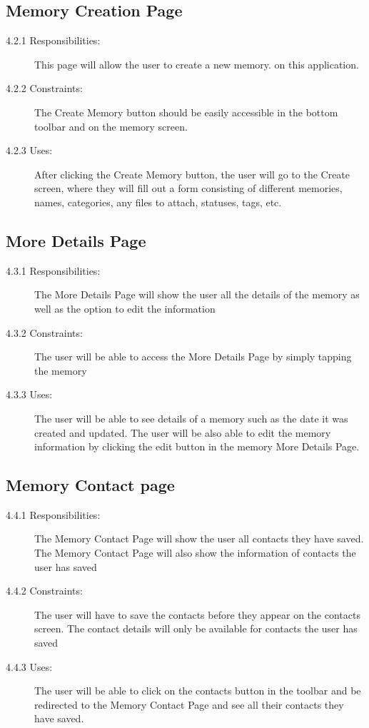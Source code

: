 \documentclass{article}
\begin{document}
\subsection{Memory Creation Page}
\begin{description}
\item[4.2.1 Responsibilities:] This page will allow the user to create a new memory.
on this application.
\item[4.2.2 Constraints:] The Create Memory button should be easily accessible in the bottom toolbar and on the memory screen.
\item[4.2.3 Uses:] After clicking the Create Memory button, the user will go to the Create screen, where they will fill out a form consisting of different memories, names, categories, any files to
attach, statuses, tags, etc.
\end{description}

\subsection{More Details Page}
\begin{description}
\item[4.3.1 Responsibilities:] The More Details Page will show the user all the details of the memory as well as the option to edit the information
\item[4.3.2 Constraints:] The user will be able to access the More Details Page by simply tapping the memory
\item[4.3.3 Uses:] The user will be able to see details of a memory such as the date it was created and updated. The user will be also able to edit the memory information by clicking the edit button in the memory More Details Page.
\end{description}

\subsection{Memory Contact page}
\begin{description}
\item[4.4.1 Responsibilities:] The Memory Contact Page will show the user all contacts they have saved. The Memory Contact Page will also show the information of contacts the user has saved
\item[4.4.2 Constraints:] The user will have to save the contacts before they appear on the contacts screen. The contact details will only be available for contacts the user has saved
\item[4.4.3 Uses:] The user will be able to click on the contacts button in the toolbar and be redirected to the Memory Contact Page and see all their contacts they have saved.
\end{description}
\end{document}
